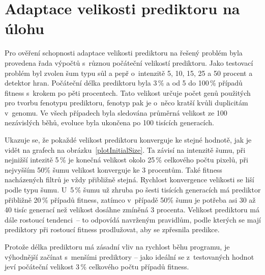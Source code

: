 \section{Adaptace velikosti prediktoru na úlohu}
\label{secExpAdapt}

Pro ověření schopnosti adaptace velikosti prediktoru na řešený problém byla provedena řada výpočtů s~různou počáteční velikostí prediktoru. Jako testovací problém byl zvolen šum typu sůl a pepř o~intenzitě 5, 10, 15, 25 a 50 procent a detektor hran. Počáteční délka prediktoru byla 3\,\% a od 5 do 100\,\% případů fitness s~krokem po pěti procentech. Tato velikost určuje počet genů použitých pro tvorbu fenotypu prediktoru, fenotyp pak je o~něco kratší kvůli duplicitám v~genomu. Ve všech případech byla sledována průměrná velikost ze 100 nezávislých běhů, evoluce byla ukončena po 100 tisících generacích.

Ukazuje se, že pokaždé velikost prediktoru konverguje ke stejné hodnotě, jak je vidět na grafech na obrázku~\ref{plotInitialSize}. Ta závisí na intenzitě šumu, při nejnižší intezitě 5\,\% je konečná velikost okolo 25\,\% celkového počtu pixelů, při nejvyšším 50\% šumu velikost konverguje ke 3 procentům. Také fitness nacházených filtrů je vždy přibližně stejná. Rychlost konvergence velikosti se liší podle typu šumu. U~5\,\% šumu už zhruba po šesti tisících generacích má prediktor přibližně 20\,\% případů fitness, zatímco v~případě 50\% šumu je potřeba asi 30 až 40 tisíc generací než velikost dosáhne zmíněná 3 procenta. Velikost prediktoru má dále rostoucí tendenci~-- to odpovídá navrženým pravidlům, podle kterých se mají prediktory při rostoucí fitness prodlužovat, aby se zpřesnila predikce.

Protože délka prediktoru má zásadní vliv na rychlost běhu programu, je výhodnější začínat s~menšími prediktory -- jako ideální se z~testovaných hodnot jeví počáteční velikost 3\,\% celkového počtu případů fitness.

